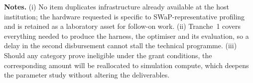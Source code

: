 \documentclass[11pt,a4paper]{article}
\begin{document}
\normalsize
\vspace{8pt}
\noindent\textbf{Notes.} (i) No item duplicates infrastructure already available at the host institution; the hardware requested is specific to SWaP-representative profiling and is retained as a laboratory asset for follow-on work. (ii) Tranche~1 covers everything needed to produce the harness, the optimiser and its evaluation, so a delay in the second disbursement cannot stall the technical programme. (iii) Should any category prove ineligible under the grant conditions, the corresponding amount will be reallocated to simulation compute, which deepens the parameter study without altering the deliverables.
\end{document}
